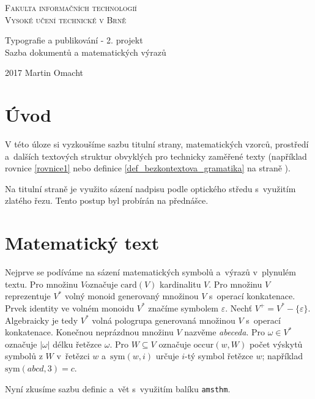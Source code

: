 \documentclass[11pt, a4paper, twocolumn]{article}
\theoremstyle{definition}
\theoremstyle{plain}
\begin{document}
	\begin{titlepage}
		\begin{center}
			{\linespread{0.75}
				\Huge
				\textsc{Fakulta informačních technologií\\ Vysoké učení technické v Brně}
			}

			{\linespread{0.8}
				\LARGE
				Typografie a publikování - 2. projekt\\
				Sazba dokumentů a matematických výrazů
			}
		\end{center}		
		{\Large 2017 \hfill Martin Omacht}
	\end{titlepage}

	\section*{Úvod} %
	\label{sec:úvod}
	V této úloze si vyzkoušíme sazbu titulní strany, matematických vzorců, prostředí a~dalších textových struktur obvyklých pro technicky zaměřené texty (například rovnice \eqref{rovnice1} nebo definice \ref{def_bezkontextova_gramatika} na straně \pageref{def_bezkontextova_gramatika}).

	Na titulní straně je využito sázení nadpisu podle optického středu s~využitím zlatého řezu. Tento postup byl probírán na přednášce.

	\section{Matematický text} %
	\label{sec:matematický_text}
	Nejprve se podíváme na sázení matematických symbolů a~výrazů v~plynulém textu. Pro množinu $V$označuje $\mathrm{card}(V)$ kardinalitu $V$.
	Pro množinu $V$ reprezentuje $V^\ast$ volný monoid generovaný množinou $V$ s~operací konkatenace.
	Prvek identity ve volném monoidu $V^*$ značíme symbolem $\varepsilon$.
	Nechť $V^+ = V^\ast - \{\varepsilon\}$. Algebraicky je tedy $V^\ast$ volná pologrupa generovaná množinou $V$ s~operací konkatenace.
	Konečnou neprázdnou množinu $V$ nazvěme \emph{abeceda}.
	Pro $\omega \in V^\ast$ označuje $|\omega|$ délku řetězce $\omega$. Pro $W \subseteq V$ označuje $\mathrm{occur}(w,W)$ počet výskytů symbolů z $W$ v~řetězci $w$ a~$\mathrm{sym}(w,i)$ určuje $i$-tý symbol řetězce $w$; například $\mathrm{sym}(abcd,3)=c$.

	Nyní zkusíme sazbu definic a~vět s~využitím balíku \texttt{amsthm}.
\end{document}
